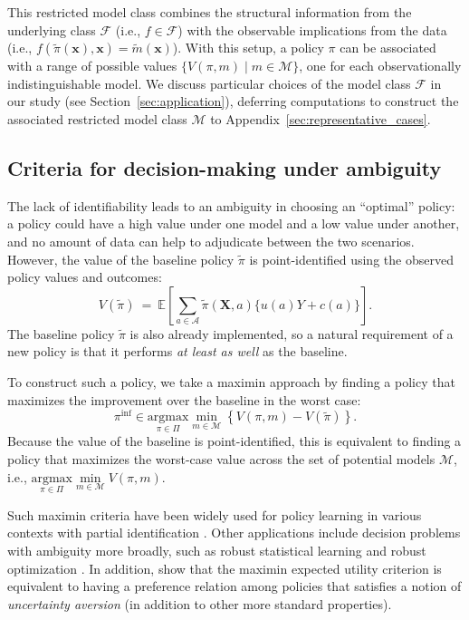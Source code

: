 \documentclass[12pt]{article}
\theoremstyle{definition}
\newcommand{\E}{\ensuremath{\mathbb{E}}}
\newcommand{\argmax}{\text{argmax}}
\newcommand{\bX}{\bm X}
\newcommand{\bx}{\bm x}
\newcommand{\<}{\langle}
\renewcommand{\>}{\rangle}
\newcommand\mcal[1]{\ensuremath{\mathcal{#1}}}
\begin{document}
This restricted model class combines the structural information
from the underlying class $\mcal{F}$ (i.e., $f \in \mathcal{F}$)
with the observable implications from the data (i.e.,
$f(\tilde{\pi}(\bx), \bx) = \tilde{m}(\bx)$).
With this setup, a policy $\pi$ can be associated with a range of
possible values $\{V(\pi, m) \mid m \in \mathcal{M}\}$, one for each
observationally indistinguishable model.  We discuss particular
choices of the model class $\mcal{F}$ in our study (see
Section~\ref{sec:application}), deferring computations to construct
the associated restricted model class $\mcal{M}$ to
Appendix~\ref{sec:representative_cases}.

\subsection{Criteria for decision-making under ambiguity}
\label{sec:opt_pop}

The lack of identifiability leads to an ambiguity in choosing
an ``optimal'' policy: a policy could have a high value under one
model and a low value under another, and no amount of data can help to
adjudicate between the two scenarios.  However, the value of the
baseline policy $\tilde{\pi}$ is point-identified using the observed
policy values and outcomes:
\begin{equation*}
  V(\tilde{\pi}) \ = \ \E\left[\sum_{a \in \mathcal{A}} \tilde{\pi}(\bX, a)\{u(a) Y + c(a)\}\right].
\end{equation*}
The baseline policy $\tilde{\pi}$ is also already
implemented, so a natural requirement of a new policy is that it
performs \emph{at least as well} as the baseline.

To construct such a policy, we take a maximin approach by finding a
policy that maximizes the improvement over the baseline in the worst
case:
\begin{equation}
  \label{eq:maximin}
   \pi^{\inf} \in \underset{\pi \in \Pi}{\argmax}\min_{m
      \in \mcal{M}}  \left\{  V(\pi, m) - V(\tilde{\pi})\right\}.
\end{equation}
Because the value of the baseline is point-identified, this is
equivalent to finding a policy that maximizes the worst-case value
across the set of potential models $\mcal{M}$, i.e.,
$\underset{\pi \in \Pi}{\argmax} \underset{m \in \mcal{M}}{\min}
V(\pi, m)$.

Such maximin criteria have been widely used for policy learning in
various contexts with partial identification
\citep[e.g.,][]{Kallus2021,Pu2021}.  Other applications include
decision problems with ambiguity more broadly, such as robust
statistical learning and robust optimization
\citep[e.g.,][]{Duchi2021_dro,Bertsimas2011}.  In
addition, \citet{Gilboa1989} show that the maximin expected utility
criterion is equivalent to having a preference relation among policies
that satisfies a notion of \emph{uncertainty aversion} (in addition to
other more standard properties).
\end{document}
